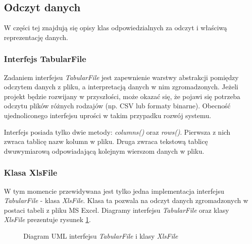 \documentclass[../thesis.tex]{subfiles}
\begin{document}
\subsection{Odczyt danych}

W części tej znajdują się opisy klas odpowiedzialnych za odczyt i właściwą reprezentację danych.

\subsubsection{Interfejs TabularFile}

Zadaniem interfejsu \emph{TabularFile} jest zapewnienie warstwy abstrakcji pomiędzy odczytem danych z pliku, a interpretacją danych w nim zgromadzonych. Jeżeli projekt będzie rozwijany w przyszłości, może okazać się, że pojawi się potrzeba odczytu plików różnych rodzajów (np. CSV lub formaty binarne). Obecność ujednoliconego interfejsu uprości w takim przypadku rozwój systemu.

Interfejs posiada tylko dwie metody: \emph{columns()} oraz \emph{rows()}. Pierwsza z nich zwraca tablicę nazw kolumn w pliku. Druga zwraca tekstową tablicę dwuwymiarową odpowiadającą kolejnym wierszom danych w pliku.

\subsubsection{Klasa XlsFile}

W tym momencie przewidywana jest tylko jedna implementacja interfejsu \emph{TabularFile} - klasa \emph{XlsFile}. Klasa ta pozwala na odczyt danych zgromadzonych w postaci tabeli z pliku MS Excel. Diagramy interfejsu \emph{TabularFile} oraz klasy \emph{XlsFile} prezentuje rysunek \ref{proj:diagram_xls_file}.

\begin{figure}[h]
\centering
{}
\caption{Diagram UML interfejsu \emph{TabularFile} i klasy \emph{XlsFile}}
\label{proj:diagram_xls_file}
\end{figure}
\end{document}
